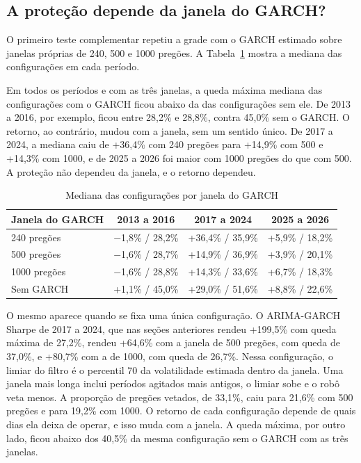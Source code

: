 \subsection{A proteção depende da janela do GARCH?}
\label{sec:janela-garch}

O primeiro teste complementar repetiu a grade com o GARCH estimado sobre janelas
próprias de 240, 500 e 1000 pregões. A Tabela~\ref{tab:janela-garch} mostra a mediana
das configurações em cada período.

Em todos os períodos e com as três janelas, a queda máxima mediana das
configurações com o GARCH ficou abaixo da das configurações sem ele. De 2013 a
2016, por exemplo, ficou entre 28,2\% e 28,8\%, contra 45,0\% sem o GARCH. O
retorno, ao contrário, mudou com a janela, sem um sentido único. De 2017 a 2024, a
mediana caiu de +36,4\% com 240 pregões para +14,9\% com 500 e +14,3\% com 1000,
e de 2025 a 2026 foi maior com 1000 pregões do que com 500. A proteção não
dependeu da janela, e o retorno dependeu.

\begin{table}[htbp]
\centering
\caption{Mediana das configurações por janela do GARCH}
\label{tab:janela-garch}
\fontsize{10}{12}\selectfont
\begin{tabular}{l|c|c|c}
\hline
Janela do GARCH & 2013 a 2016 & 2017 a 2024 & 2025 a 2026 \\
\hline
240 pregões & $-$1,8\% / 28,2\% & +36,4\% / 35,9\% & +5,9\% / 18,2\% \\
500 pregões & $-$1,6\% / 28,7\% & +14,9\% / 36,9\% & +3,9\% / 20,1\% \\
1000 pregões & $-$1,6\% / 28,8\% & +14,3\% / 33,6\% & +6,7\% / 18,3\% \\
\hline
Sem GARCH & +1,1\% / 45,0\% & +29,0\% / 51,6\% & +8,8\% / 22,6\% \\
\hline
\end{tabular}
\end{table}

O mesmo aparece quando se fixa uma única configuração. O ARIMA-GARCH Sharpe de
2017 a 2024, que nas seções anteriores rendeu +199,5\% com queda máxima de 27,2\%,
rendeu +64,6\% com a janela de 500 pregões, com queda de 37,0\%, e +80,7\% com a de
1000, com queda de 26,7\%. Nessa configuração, o limiar do filtro é o percentil 70
da volatilidade estimada dentro da janela. Uma janela mais longa inclui períodos
agitados mais antigos, o limiar sobe e o robô veta menos. A proporção de pregões
vetados, de 33,1\%, caiu para 21,6\% com 500 pregões e para 19,2\% com 1000. O
retorno de cada configuração depende de quais dias ela deixa de operar, e isso
muda com a janela. A queda máxima, por outro lado, ficou abaixo dos 40,5\% da
mesma configuração sem o GARCH com as três janelas.

